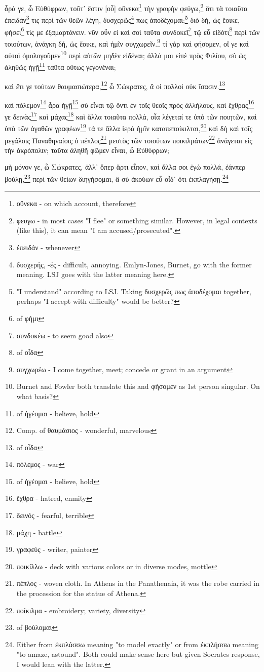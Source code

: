 ἆρά
γε,
ὦ
Εὐθύφρων,
τοῦτ᾽
ἔστιν
[οὗ]
οὕνεκα\footnote{οὕνεκα - on which account, therefore}
τὴν
γραφὴν
φεύγω,\footnote{φευγω - in most cases "I flee" or something similar. However, in legal contexts (like this), it can mean "I am accused/prosecuted".}
ὅτι
τὰ
τοιαῦτα
ἐπειδάν\footnote{ἐπειδάν - whenever}
τις
περὶ
τῶν
θεῶν
λέγῃ,
δυσχερῶς\footnote{δυσχερής, -ές - difficult, annoying. Emlyn-Jones, Burnet, go with the former meaning. LSJ goes with the latter meaning here.}
πως
ἀποδέχομαι;\footnote{"I understand" according to LSJ. Taking δυσχερῶς πως ἀποδέχομαι together, perhaps "I accept with difficulty" would be better?}
διὸ
δή,
ὡς
ἔοικε,
φήσει\footnote{ of φήμι}
τίς
με
ἐξαμαρτάνειν.
νῦν
οὖν
εἰ
καὶ
σοὶ
ταῦτα
συνδοκεῖ\footnote{συνδοκέω - to seem good also}
τῷ 
\versification{[6b]}
εὖ
εἰδότι\footnote{ of οἶδα}
περὶ
τῶν
τοιούτων,
ἀνάγκη
δή,
ὡς
ἔοικε,
καὶ
ἡμῖν
συγχωρεῖν.\footnote{συγχωρέω - I come together, meet; concede or grant in an argument}
τί
γὰρ
καὶ
φήσομεν,
οἵ
γε
καὶ
αὐτοὶ
ὁμολογοῦμεν\footnote{Burnet and Fowler both translate this and φήσομεν as 1st person singular. On what basis?}
περὶ
αὐτῶν
μηδὲν
εἰδέναι;
ἀλλά
μοι
εἰπὲ
πρὸς
Φιλίου,
σὺ
ὡς
ἀληθῶς
ἡγῇ\footnote{ of ἡγέομαι - believe, hold}
ταῦτα
οὕτως
γεγονέναι;

καὶ
ἔτι
γε
τούτων
θαυμασιώτερα,\footnote{Comp. of θαυμάσιος - wonderful, marvelous}
ὦ
Σώκρατες,
ἃ
οἱ
πολλοὶ
οὐκ
ἴσασιν.\footnote{ of οἶδα}

καὶ
πόλεμον\footnote{πόλεμος - war}
ἆρα
ἡγῇ\footnote{ of ἡγέομαι - believe, hold}
σὺ
εἶναι
τῷ
ὄντι
ἐν
τοῖς
θεοῖς
πρὸς
ἀλλήλους,
καὶ
ἔχθρας\footnote{ἔχθρα - hatred, enmity}
γε
δεινὰς\footnote{δεινός - fearful, terrible}
καὶ
μάχας\footnote{μάχη - battle}
καὶ
ἄλλα
τοιαῦτα
πολλά,
οἷα
λέγεταί
τε
ὑπὸ
τῶν
ποιητῶν,
καὶ
ὑπὸ
τῶν 
\versification{[6c]}
ἀγαθῶν
γραφέων\footnote{γραφεύς - writer, painter}
τά
τε
ἄλλα
ἱερὰ
ἡμῖν
καταπεποίκιλται,\footnote{ποικίλλω - deck with various colors or in diverse modes, mottle}
καὶ
δὴ
καὶ
τοῖς
μεγάλοις
Παναθηναίοις
ὁ
πέπλος\footnote{πέπλος - woven cloth. In Athens in the Panathenaia, it was the robe carried in the procession for the statue of Athena.}
μεστὸς
τῶν
τοιούτων
ποικιλμάτων\footnote{ποίκιλμα - embroidery; variety, diversity}
ἀνάγεται
εἰς
τὴν
ἀκρόπολιν;
ταῦτα
ἀληθῆ
φῶμεν
εἶναι,
ὦ
Εὐθύφρων;

μὴ 
μόνον
γε,
ὦ
Σώκρατες,
ἀλλ᾽
ὅπερ
ἄρτι
εἶπον,
καὶ
ἄλλα
σοι
ἐγὼ
πολλά,
ἐάνπερ
βούλῃ,\footnote{ of βούλομαι}
περὶ
τῶν
θείων
διηγήσομαι,
ἃ
σὺ
ἀκούων
εὖ
οἶδ᾽
ὅτι
ἐκπλαγήσῃ.\footnote{Either from ἐκπλάσσω meaning "to model exactly" or from ἐκπλήσσω meaning "to amaze, astound". Both could make sense here but given Socrates response, I would lean with the latter.}

